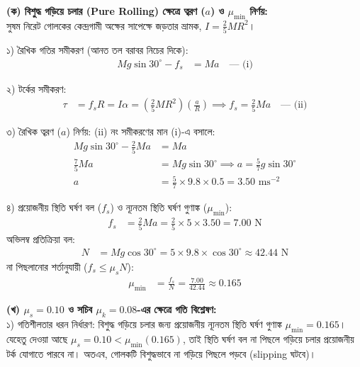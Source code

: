 \documentclass[12pt, a4paper]{article}
\begin{document}
\begin{tcolorbox}[solutionbox={সমাধান (Solution)}]
\noindent
\textbf{(ক) বিশুদ্ধ গড়িয়ে চলার (Pure Rolling) ক্ষেত্রে ত্বরণ ($a$) ও $\mu_{\min}$ নির্ণয়:} \\
সুষম নিরেট গোলকের কেন্দ্রগামী অক্ষের সাপেক্ষে জড়তার ভ্রামক, $I = \frac{2}{5} M R^2$।

১) রৈখিক গতির সমীকরণ (আনত তল বরাবর নিচের দিকে):
\begin{align*}
    M g \sin 30^\circ - f_s &= M a \quad \text{--- (i)}
\end{align*}

২) টর্কের সমীকরণ:
\begin{align*}
    \tau &= f_s R = I \alpha = \left(\frac{2}{5} M R^2\right) \left(\frac{a}{R}\right) \implies f_s = \frac{2}{5} M a \quad \text{--- (ii)}
\end{align*}

৩) রৈখিক ত্বরণ ($a$) নির্ণয়: (ii) নং সমীকরণের মান (i)-এ বসালে:
\begin{align*}
    M g \sin 30^\circ - \frac{2}{5} M a &= M a \\
    \frac{7}{5} M a &= M g \sin 30^\circ \implies a = \frac{5}{7} g \sin 30^\circ \\
    a &= \frac{5}{7} \times 9.8 \times 0.5 = \mathbf{3.50}\text{ ms}^{-2}
\end{align*}

৪) প্রয়োজনীয় স্থিতি ঘর্ষণ বল ($f_s$) ও ন্যূনতম স্থিতি ঘর্ষণ গুণাঙ্ক ($\mu_{\min}$):
\begin{align*}
    f_s &= \frac{2}{5} M a = \frac{2}{5} \times 5 \times 3.50 = 7.00\text{ N}
\end{align*}
অভিলম্ব প্রতিক্রিয়া বল:
\begin{align*}
    N &= M g \cos 30^\circ = 5 \times 9.8 \times \cos 30^\circ \approx 42.44\text{ N}
\end{align*}
না পিছলানোর শর্তানুযায়ী ($f_s \le \mu_s N$):
\begin{align*}
    \mu_{\min} &= \frac{f_s}{N} = \frac{7.00}{42.44} \approx \mathbf{0.165}
\end{align*}

\vspace{0.5em}
\noindent\textbf{(খ) $\mu_s = 0.10$ ও সচিব $\mu_k = 0.08$-এর ক্ষেত্রে গতি বিশ্লেষণ:} \\
১) গতিশীলতার ধরন নির্ধারণ: বিশুদ্ধ গড়িয়ে চলার জন্য প্রয়োজনীয় ন্যূনতম স্থিতি ঘর্ষণ গুণাঙ্ক $\mu_{\min} = 0.165$। যেহেতু দেওয়া আছে $\mu_s = 0.10 < \mu_{\min} (0.165)$, তাই স্থিতি ঘর্ষণ বল না পিছলে গড়িয়ে চলার প্রয়োজনীয় টর্ক যোগাতে পারবে না। অতএব, গোলকটি বিশুদ্ধভাবে না গড়িয়ে পিছলে পড়বে (slipping ঘটবে)।


\end{tcolorbox}
\end{document}
